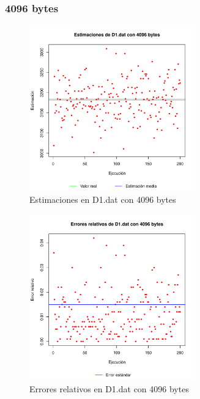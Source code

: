 \subsubsection{4096 bytes}
\begin{figure}[h!]
    \centering
        \includegraphics[width=0.64\textwidth]{../figs/D1/plot_estimation_4096.pdf}
        \caption{Estimaciones en D1.dat con 4096 bytes}
    \label{figura:D1_estimation_4096}
\end{figure}

\begin{figure}[h!]
    \centering
        \includegraphics[width=0.64\textwidth]{../figs/D1/plot_errors_4096.pdf}
        \caption{Errores relativos en D1.dat con 4096 bytes}
    \label{figura:D1_errors_4096}
\end{figure}

